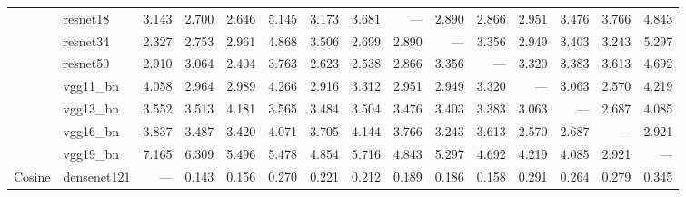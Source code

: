 \begin{table}
\begin{tabular}{llrrrrrrrrrrrrr}
       & resnet18 &                 3.143 &                 2.700 &                 2.646 &               5.145 &                   3.173 &                   3.681 &                --- &              2.890 &              2.866 &               2.951 &               3.476 &               3.766 &               4.843 \\
       & resnet34 &                 2.327 &                 2.753 &                 2.961 &               4.868 &                   3.506 &                   2.699 &              2.890 &                --- &              3.356 &               2.949 &               3.403 &               3.243 &               5.297 \\
       & resnet50 &                 2.910 &                 3.064 &                 2.404 &               3.763 &                   2.623 &                   2.538 &              2.866 &              3.356 &                --- &               3.320 &               3.383 &               3.613 &               4.692 \\
       & vgg11_bn &                 4.058 &                 2.964 &                 2.989 &               4.266 &                   2.916 &                   3.312 &              2.951 &              2.949 &              3.320 &                 --- &               3.063 &               2.570 &               4.219 \\
       & vgg13_bn &                 3.552 &                 3.513 &                 4.181 &               3.565 &                   3.484 &                   3.504 &              3.476 &              3.403 &              3.383 &               3.063 &                 --- &               2.687 &               4.085 \\
       & vgg16_bn &                 3.837 &                 3.487 &                 3.420 &               4.071 &                   3.705 &                   4.144 &              3.766 &              3.243 &              3.613 &               2.570 &               2.687 &                 --- &               2.921 \\
       & vgg19_bn &                 7.165 &                 6.309 &                 5.496 &               5.478 &                   4.854 &                   5.716 &              4.843 &              5.297 &              4.692 &               4.219 &               4.085 &               2.921 &                 --- \\
\cline{1-15}
\multirow{13}{*}{Cosine} & densenet121 &                   --- &                 0.143 &                 0.156 &               0.270 &                   0.221 &                   0.212 &              0.189 &              0.186 &              0.158 &               0.291 &               0.264 &               0.279 &               0.345 \\

\end{tabular}
\end{table}
